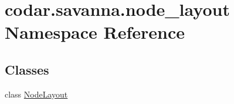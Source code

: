 \hypertarget{namespacecodar_1_1savanna_1_1node__layout}{}\section{codar.\+savanna.\+node\+\_\+layout Namespace Reference}
\label{namespacecodar_1_1savanna_1_1node__layout}
\subsection*{Classes}
\begin{DoxyCompactItemize}
\item 
class \hyperlink{classcodar_1_1savanna_1_1node__layout_1_1_node_layout}{Node\+Layout}
\end{DoxyCompactItemize}
